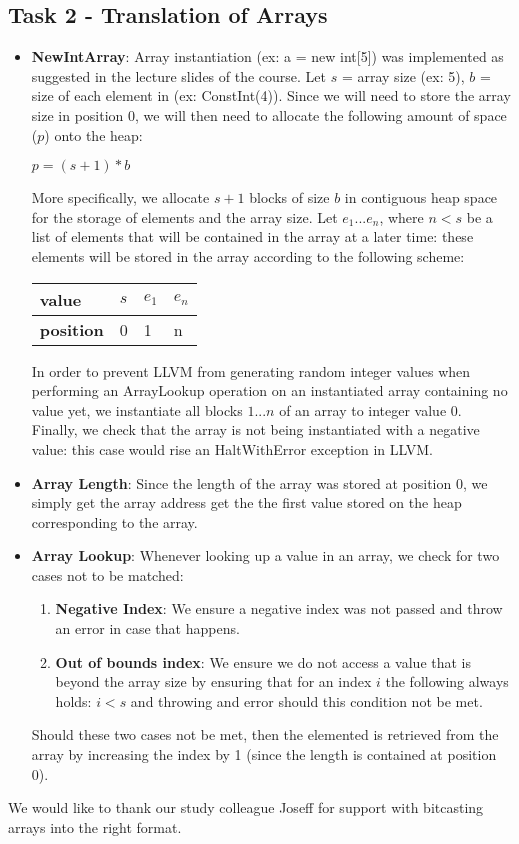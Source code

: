 \documentclass[paper=a4, fontsize=11pt]{scrartcl}
\numberwithin{equation}{section}		%
\numberwithin{figure}{section}			%
\numberwithin{table}{section}				%
\begin{document}
\subsection*{Task 2 - Translation of Arrays}
\begin{itemize}

\item \textbf{NewIntArray}: Array instantiation (ex: a = new int[5]) was implemented as suggested in the lecture slides of the course. Let $s$ = array size (ex: 5), $b$ = size of each element in (ex: ConstInt(4)). Since we will need to store the array size in position 0, we will then need to allocate the following amount of space ($p$) onto the heap:\\
\begin{center}
 $p = (s + 1) * b$
\end{center}
More specifically, we allocate $s + 1$ blocks of size $b$ in contiguous heap space for the storage of elements and the array size. Let $e_1... e_n$, where $n < s$ be a list of elements that will be contained in the array at a later time: these elements will be stored in the array according to the following scheme:
\begin{center}
\begin{table}[h]
\centering
\begin{tabular}{|l|l|l|l|}
\hline
\textbf{value}    & $s$ & $e_1$ & $e_n$ \\ \hline
\textbf{position} & 0      & 1  & n  \\ \hline
\end{tabular}
\end{table}
\end{center}
In order to prevent LLVM from generating random integer values when performing an ArrayLookup operation on an instantiated array containing no value yet, we instantiate all blocks $1...n$ of an array to integer value 0. 
Finally, we check that the array is not being instantiated with a negative value: this case would rise an HaltWithError exception in LLVM. 

\item \textbf{Array Length}: Since the length of the array was stored at position 0, we simply get the array address get the the first value stored on the heap corresponding to the array. 
\item \textbf{Array Lookup}: Whenever looking up a value in an array, we check for two cases not to be matched:
\begin{enumerate}
	\item \textbf{Negative Index}: We ensure a negative index was not passed and throw an error in case that happens. 
	\item \textbf{Out of bounds index}: We ensure we do not access a value that is beyond the array size by ensuring that for an index $i$ the following always holds: $i < s$ and throwing and error should this condition not be met.
\end{enumerate}
Should these two cases not be met, then the elemented is retrieved from the array by increasing the index by 1 (since the length is contained at position 0).

\end{itemize}


\begin{thebibliography}{9}%
We would like to thank our study colleague Joseff for support with bitcasting arrays into the right format.
\end{thebibliography}
\end{document}
